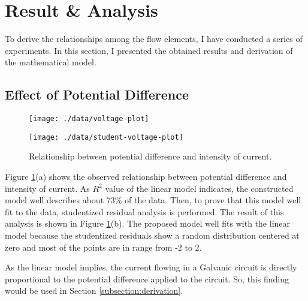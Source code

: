 
\section{Result \& Analysis}

To derive the relationships among the flow elements, I have conducted a series of experiments.
In this section, I presented the obtained results and derivation of the mathematical model.

\subsection{Effect of Potential Difference}
\label{subsection:voltage}

\begin{figure}[!t]
  \centering
  \begin{subfloat}[][Potential difference-current data and linear regression model: $y = 1.3677x + 0.3404, R^2 = 0.731$. $y$ denotes current, $x$ denotes relative potential difference.]
    {
      \texttt{[image: ./data/voltage-plot]}
    }
  \end{subfloat}

  \hfill

  \begin{subfloat}
    {
      \texttt{[image: ./data/student-voltage-plot]}
    }
  \end{subfloat}

  \caption{Relationship between potential difference and intensity of current.}
  \label{plot:voltage-current}
\end{figure}

Figure \ref{plot:voltage-current}(a) shows the observed relationship between potential difference and intensity of current.
As $R^2$ value of the linear model indicates, the constructed model well describes about 73\% of the data.
Then, to prove that this model well fit to the data, studentized residual analysis is performed.
The result of this analysis is shown in Figure \ref{plot:voltage-current}(b).
The proposed model well fits with the linear model because the studentized residuals show a random distribution centered at zero and most of the points are in range from -2 to 2.

As the linear model implies, the current flowing in a Galvanic circuit is directly proportional to the potential difference applied to the circuit.
So, this finding would be used in Section \ref{subsection:derivation}.

